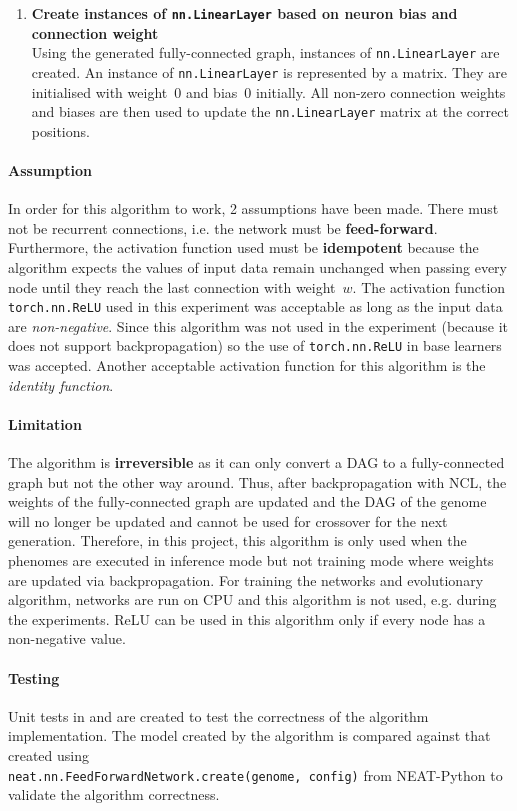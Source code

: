 \documentclass{article}
\begin{document}
\begin{enumerate}
    \item \textbf{Create instances of \texttt{nn.LinearLayer} based on neuron bias and connection weight} \\
    Using the generated fully-connected graph, instances of \texttt{nn.LinearLayer} are created. An instance of \texttt{nn.LinearLayer} is represented by a matrix. They are initialised with weight~$0$ and bias~$0$ initially. All non-zero connection weights and biases are then used to update the \texttt{nn.LinearLayer} matrix at the correct positions. 
\end{enumerate}

\paragraph{Assumption}
In order for this algorithm to work, 2 assumptions have been made. 
There must not be recurrent connections, i.e. the network must be \textbf{feed-forward}. 
Furthermore, the activation function used must be \textbf{idempotent} because the algorithm expects the values of input data remain unchanged when passing every node until they reach the last connection with weight~$w$. The activation function \texttt{torch.nn.ReLU} used in this experiment was acceptable as long as the input data are \textit{non-negative}. Since this algorithm was not used in the experiment (because it does not support backpropagation) so the use of \texttt{torch.nn.ReLU} in base learners was accepted. Another acceptable activation function for this algorithm is the \textit{identity function}. 

\paragraph{Limitation}
The algorithm is \textbf{irreversible} as it can only convert a DAG to a fully-connected graph but not the other way around. Thus, after backpropagation with NCL, the weights of the fully-connected graph are updated and the DAG of the genome will no longer be updated and cannot be used for crossover for the next generation. Therefore, in this project, this algorithm is only used when the phenomes are executed in inference mode but not training mode where weights are updated via backpropagation. For training the networks and evolutionary algorithm, networks are run on CPU and this algorithm is not used, e.g. during the experiments. 
ReLU can be used in this algorithm only if every node has a non-negative value. 

\paragraph{Testing}
Unit tests in  and  are created to test the correctness of the algorithm implementation. The model created by the algorithm is compared against that created using 
\\
\texttt{neat.nn.FeedForwardNetwork.create(genome, config)} from NEAT-Python to validate the algorithm correctness. 
\end{document}
